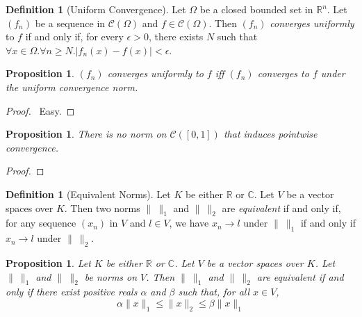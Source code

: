 \documentclass{book}
\let\qed\relax
\newtheorem{prop}[ax]{Proposition}
\theoremstyle{definition}
\newtheorem{df}[ax]{Definition}
\begin{document}
\begin{df}[Uniform Convergence]
Let $\Omega$ be a closed bounded set in $\mathbb{R}^n$. Let $(f_n)$ be a sequence in $\mathcal{C}(\Omega)$ and $f \in \mathcal{C}(\Omega)$. Then $(f_n)$ \emph{converges uniformly} to $f$ if and only if, for every $\epsilon > 0$, there exists $N$ such that $\forall x \in \Omega. \forall n \geq N. |f_n(x) - f(x)| < \epsilon$.
\end{df}

\begin{prop}
$(f_n)$ converges uniformly to $f$ iff $(f_n)$ converges to $f$ under the uniform convergence norm.
\end{prop}

\begin{proof}
\pf\ Easy. \qed
\end{proof}

\begin{prop}
There is no norm on $\mathcal{C}([0,1])$ that induces pointwise convergence.
\end{prop}

\begin{proof}
\pf
{}
\qed
\end{proof}

\begin{df}[Equivalent Norms]
Let $K$ be either $\mathbb{R}$ or $\mathbb{C}$. Let $V$ be a vector spaces over $K$. Then two norms $\|\ \|_1$ and $\|\ \|_2$ are \emph{equivalent} if and only if, for any sequence $(x_n)$ in $V$ and $l \in V$, we have $x_n \rightarrow l$ under $\|\ \|_1$ if and only if $x_n \rightarrow l$ under $\|\ \|_2$.
\end{df}

\begin{prop}
Let $K$ be either $\mathbb{R}$ or $\mathbb{C}$. Let $V$ be a vector spaces over $K$. Let $\|\ \|_1$ and $\|\ \|_2$ be norms on $V$. Then $\|\ \|_1$ and $\|\ \|_2$ are equivalent if and only if there exist positive reals $\alpha$ and $\beta$ such that, for all $x \in V$,
\begin{equation}
\label{eq:eqnorm}
 \alpha \| x \|_1 \leq \| x \|_2 \leq \beta \| x \|_1
 \end{equation}
\end{prop}
\end{document}
